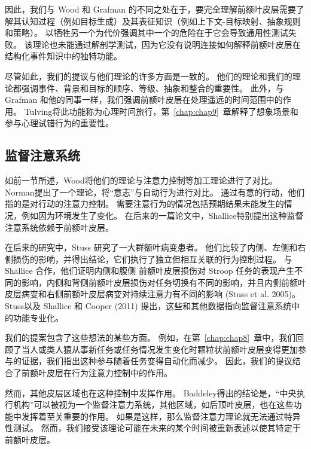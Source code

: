 因此，我们与 Wood 和 Grafman 的不同之处在于，要完全理解前额叶皮层需要了解其认知过程（例如目标生成）及其表征知识（例如上下文-目标映射、抽象规则和策略）。
以牺牲另一个为代价强调其中一个的危险在于它会导致通用性测试失败。
该理论也未能通过解剖学测试，因为它没有说明连接如何解释前额叶皮层在结构化事件知识中的独特功能。
\par


尽管如此，我们的提议与他们理论的许多方面是一致的。
他们的理论和我们的理论都强调事件、背景和目标的顺序、等级、抽象和整合的重要性。
此外，与 Grafman 和他的同事\cite{gomez2004patients}一样，我们强调前额叶皮层在处理遥远的时间范围中的作用。
Tulving\cite{tulving2005episodic}将此功能称为心理时间旅行，第~\ref{chap:chap9}~章解释了想象场景和参与心理试错行为的重要性。



\subsection{监督注意系统}

如前一节所述，Wood\cite{wood2003human}将他们的理论与注意力控制等加工理论进行了对比。
Norman\cite{norman1980attention}提出了一个理论，将“意志”与自动行为进行对比。
通过有意的行动，他们指的是对行动的注意力控制。
需要注意行为的情况包括预期结果未能发生的情况，例如因为环境发生了变化。
在后来的一篇论文中，Shallice\cite{shallice1982specific}特别提出这种监督注意系统依赖于前额叶皮层。
\par


在后来的研究中，Stuss\cite{stuss2007there} 研究了一大群额叶病变患者。
他们比较了内侧、左侧和右侧损伤的影响，并得出结论，它们执行了独立但相互关联的行为控制过程。
与 Shallice 合作，他们证明内侧和腹侧 前额叶皮层损伤对 Stroop 任务的表现产生不同的影响\cite{alexander2007regional}，内侧和背侧前额叶皮层损伤对任务切换有不同的影响\cite{shallice2008multiple}，并且内侧前额叶皮层病变和右侧前额叶皮层病变对持续注意力有不同的影响 (Stuss et al. 2005)。
Stuss\cite{stuss2006frontal}以及 Shallice 和 Cooper (2011) 提出，这些和其他数据指向监督注意系统中的功能专业化。
\par


我们的提案包含了这些想法的某些方面。
例如，在第~\ref{chap:chap8}~章中，我们回顾了当人或类人猿从事新任务或任务情况发生变化时颗粒状前额叶皮层变得更加参与的证据，我们指出这种参与随着任务变得自动化而减少。
因此，我们的提议结合了前额叶皮层在行为注意力控制中的作用。
\par


然而，其他皮层区域也在这种控制中发挥作用。
Baddeley\cite{baddeley1998random}得出的结论是，“中央执行机构”可以被视为一个监督注意力系统，其他区域，如后顶叶皮层，也在这些功能中发挥着至关重要的作用。
如果是这样，那么监督注意力理论就无法通过特异性测试。
然而，我们接受该理论可能在未来的某个时间被重新表述以使其特定于前额叶皮层。
\par


